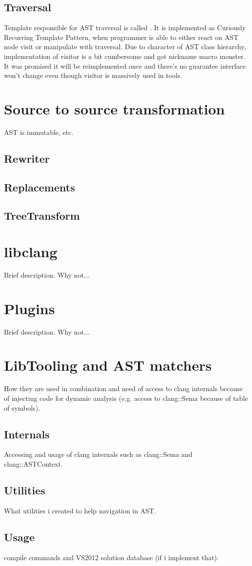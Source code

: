 \subsection{Traversal}
Template responsible for AST traversal is called . It is implemented as Curiously Recurring Template Pattern, when programmer is able to either react on AST node visit or manipulate with traversal. Due to character of AST class hierarchy, implementation of visitor is a bit cumbersome and got nickname macro monster. It was promised it will be reimplemented once and there's no guarantee interface won't change even though visitor is massively used in tools.

\section{Source to source transformation}
AST is immutable, etc.

\subsection{Rewriter}
\subsection{Replacements}
\subsection{TreeTransform}

\section{libclang}
Brief description. Why not...

\section{Plugins}
Brief description. Why not...

\section{LibTooling and AST matchers}
How they are used in combination and need of access to clang internals because of injecting code for dynamic analysis (e.g. access to clang::Sema because of table of symbols).

\subsection{Internals}
Accessing and usage of clang internals such as clang::Sema and clang::ASTContext.

\subsection{Utilities}
What utilities i created to help navigation in AST.

\subsection{Usage}
compile commands and VS2012 solution database (if i implement that).